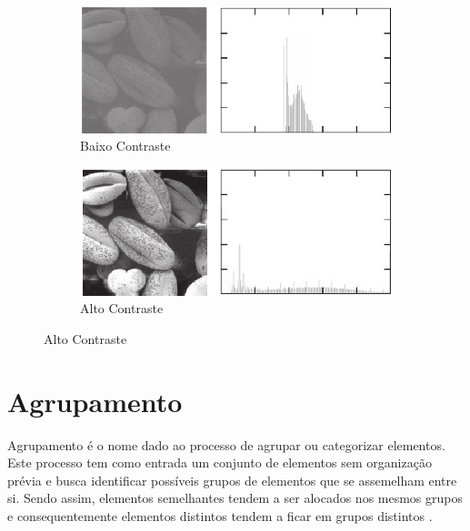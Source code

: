 \begin{figure}[h]
\begin{center}
  \begin{subfigure}[b]{0.49\textwidth}
  \centering
    \includegraphics[scale=0.45]{images/baixoContraste.jpg}
    \caption{Baixo Contraste}
    \label{baixoContraste}
  \end{subfigure}
  \begin{subfigure}[b]{0.49\textwidth}
  \centering
    \includegraphics[scale=0.45]{images/altoContraste.jpg}
    \caption{Alto Contraste}
    \label{altoContraste}
  \end{subfigure}
  
  \label{histogramas}
\end{center}

\end{figure}



\section{Agrupamento}
Agrupamento é o nome dado ao processo de agrupar ou categorizar elementos. Este processo tem como entrada um conjunto de elementos sem organização prévia e busca identificar possíveis grupos de elementos que se assemelham entre si. Sendo assim, elementos semelhantes tendem a ser alocados nos mesmos grupos e consequentemente elementos distintos tendem a ficar em grupos distintos \cite{carvalho}. 

